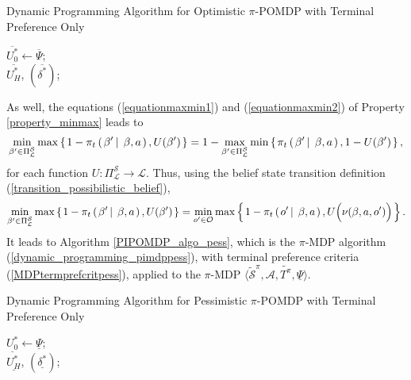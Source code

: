 \begin{algorithm} \caption{Dynamic Programming Algorithm for Optimistic $\pi$-POMDP\hspace{20cm} with Terminal Preference Only} \label{PIPOMDP_algo_opt}
$\overline{U^*_0} \gets \overline{\Psi}$;\\
\Return $\overline{U^*_H}$, $(\overline{\delta^*})$;
\end{algorithm}

As well, the equations (\ref{equationmaxmin1}) and (\ref{equationmaxmin2}) of Property \ref{property_minmax}
leads to
\[  \displaystyle \min_{\beta' \in \Pi^{\mathcal{S}}_{\mathcal{L}}} \max \left\{ \left.  1 - \pi_t \left( \left.  \beta' \, \right| \left. \, \beta, a \right. \right), U(\beta')  \right. \right\} = 
1 - \max_{\beta' \in \Pi^{\mathcal{S}}_{\mathcal{L}}} \min \left\{ \left.  \pi_t \left( \left.  \beta' \, \right| \left. \, \beta, a \right. \right), 1- U(\beta')  \right. \right\}, \]
for each function $U: \Pi^{\mathcal{S}}_{\mathcal{L}} \rightarrow \mathcal{L}$.
Thus, using the belief state transition definition (\ref{transition_possibilistic_belief}), 
\[ \min_{\beta' \in \Pi^{\mathcal{S}}_{\mathcal{L}}} \max \left\{ \left.  1 - \pi_t \left( \left.  \beta' \, \right| \left. \, \beta, a \right. \right), U(\beta')  \right. \right\} = \min_{o' \in \mathcal{O}} \max \left\{ \left.  1 - \pi_t \left( \left.  o' \, \right| \left. \, \beta, a \right. \right), U\Big( \nu(\beta,a,o')\Big)  \right. \right\} . \]
It leads to Algorithm \ref{PIPOMDP_algo_pess},
which is the $\pi$-MDP algorithm (\ref{dynamic_programming_pimdppess}),
with terminal preference criteria (\ref{MDPtermprefcritpess}),
applied to the $\pi$-MDP $\langle \tilde{\mathcal{S}}^{\pi}, \mathcal{A}, \tilde{T^{\pi}}, \underline{\Psi} \rangle$.

\begin{algorithm} \caption{Dynamic Programming Algorithm for Pessimistic $\pi$-POMDP\hspace{20cm} with Terminal Preference Only} \label{PIPOMDP_algo_pess}
$\underline{U^*_0} \gets \underline{\Psi}$;\\
\Return $\underline{U^*_H}$, $(\underline{\delta^*})$;
\end{algorithm}

